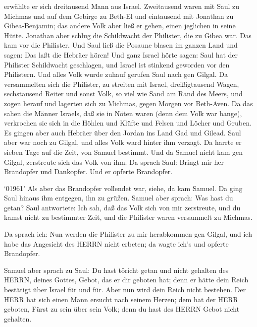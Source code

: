  erwählte er sich dreitausend Mann aus Israel. Zweitausend
waren mit Saul zu Michmas und auf dem Gebirge zu Beth-El und eintausend
mit Jonathan zu Gibea-Benjamin; das andere Volk aber ließ er gehen,
einen jeglichen in seine Hütte.  Jonathan aber schlug die
Schildwacht der Philister, die zu Gibea war. Das kam vor die Philister.
Und Saul ließ die Posaune blasen im ganzen Land und sagen: Das laßt die
Hebräer hören!  Und ganz Israel hörte sagen: Saul hat der
Philister Schildwacht geschlagen, und Israel ist stinkend geworden vor
den Philistern. Und alles Volk wurde zuhauf gerufen Saul nach gen
Gilgal.  Da versammelten sich die Philister, zu streiten mit
Israel, dreißigtausend Wagen, sechstausend Reiter und sonst Volk, so
viel wie Sand am Rand des Meers, und zogen herauf und lagerten sich zu
Michmas, gegen Morgen vor Beth-Aven.  Da das sahen die
Männer Israels, daß sie in Nöten waren (denn dem Volk war bange),
verkrochen sie sich in die Höhlen und Klüfte und Felsen und Löcher und
Gruben.  Es gingen aber auch Hebräer über den Jordan ins
Land Gad und Gilead. Saul aber war noch zu Gilgal, und alles Volk ward
hinter ihm verzagt.  Da harrte er sieben Tage auf die Zeit,
von Samuel bestimmt. Und da Samuel nicht kam gen Gilgal, zerstreute sich
das Volk von ihm.  Da sprach Saul: Bringt mir her Brandopfer
und Dankopfer. Und er opferte Brandopfer.

 `01961' Als aber das Brandopfer vollendet war, siehe, da
kam Samuel. Da ging Saul hinaus ihm entgegen, ihn zu grüßen.
 Samuel aber sprach: Was hast du getan? Saul antwortete:
Ich sah, daß das Volk sich von mir zerstreute, und du kamst nicht zu
bestimmter Zeit, und die Philister waren versammelt zu Michmas.

 Da sprach ich: Nun werden die Philister zu mir herabkommen
gen Gilgal, und ich habe das Angesicht des HERRN nicht erbeten; da wagte
ich's und opferte Brandopfer.

 Samuel aber sprach zu Saul: Du hast töricht getan und
nicht gehalten des HERRN, deines Gottes, Gebot, das er dir geboten hat;
denn er hätte dein Reich bestätigt über Israel für und für.
 Aber nun wird dein Reich nicht bestehen. Der HERR hat sich
einen Mann ersucht nach seinem Herzen; dem hat der HERR geboten, Fürst
zu sein über sein Volk; denn du hast des HERRN Gebot nicht gehalten.

